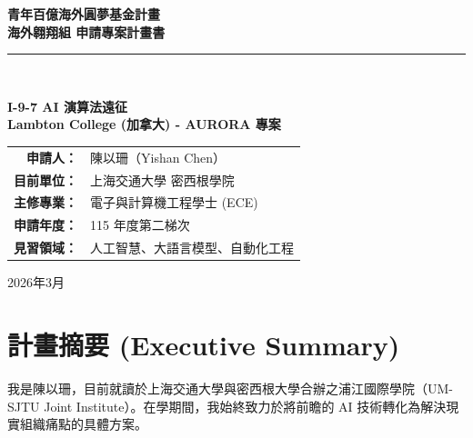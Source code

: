 \documentclass[12pt,a4paper]{article}
\begin{document}
\begin{titlepage}
    \begin{center}
        \vspace*{1.5cm}
        {\huge \bfseries 青年百億海外圓夢基金計畫} \\
        \vspace{0.3cm}
        {\Large \bfseries 海外翱翔組 \quad 申請專案計畫書} \\
        \vspace{1cm}
        \rule{\textwidth}{1.5pt} \\
        \vspace{1.5cm}
        
        \begin{tcolorbox}[colback=white,colframe=blue!50!black,width=0.8\textwidth]
            \centering \Large \bfseries I-9-7 AI 演算法遠征 \\
            \vspace{0.2cm}
            \large Lambton College (加拿大) - AURORA 專案
        \end{tcolorbox}

        \vspace{2cm}

        \begin{tabularx}{0.6\textwidth}{rX}
            \textbf{申請人：} & 陳以珊（Yishan Chen） \\
            \textbf{目前單位：} & 上海交通大學 密西根學院 \\
            \textbf{主修專業：} & 電子與計算機工程學士 (ECE) \\
            \textbf{申請年度：} & 115 年度第二梯次 \\
            \textbf{見習領域：} & 人工智慧、大語言模型、自動化工程
        \end{tabularx}

        \vfill
        {\large 2026年3月}
    \end{center}
\end{titlepage}

\newpage

\renewcommand{\contentsname}{目錄}
\tableofcontents
\newpage

\section{計畫摘要 (Executive Summary)}

我是陳以珊，目前就讀於上海交通大學與密西根大學合辦之浦江國際學院（UM-SJTU Joint Institute）。在學期間，我始終致力於將前瞻的 AI 技術轉化為解決現實組織痛點的具體方案。
\end{document}
